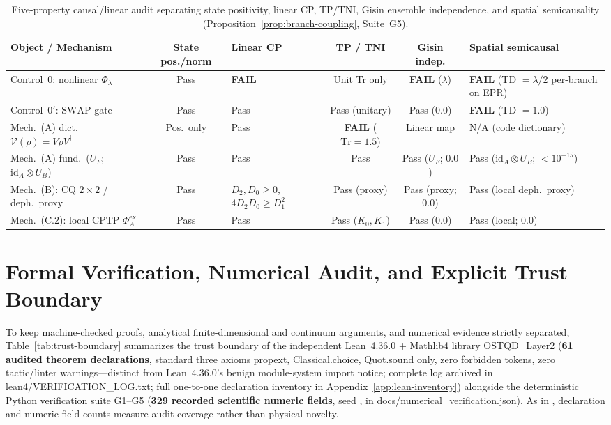 \documentclass[11pt,a4paper]{article}
\theoremstyle{definition}
\theoremstyle{remark}
\newcommand{\id}{\mathrm{id}}
\newcommand{\1}{\mathbf{1}}
\newcommand{\code}[1]{{\scriptsize\ttfamily #1}}
\begin{document}
\begin{table}[!tb]
\centering
\caption{Five-property causal/linear audit separating state positivity, linear CP, TP/TNI, Gisin ensemble independence, and spatial semicausality (Proposition~\ref{prop:branch-coupling}, Suite~G5).}
\label{tab:gate}
\scriptsize
\setlength{\tabcolsep}{3.2pt}
\begin{tabular}{@{} >{\raggedright\arraybackslash}p{2.9cm} c >{\centering\arraybackslash}p{2.0cm} c c >{\raggedright\arraybackslash}p{2.8cm} @{}}
\toprule
Object / Mechanism & State pos./norm & Linear CP & TP / TNI & Gisin indep. & Spatial semicausal \\
\midrule
Control~0: nonlinear $\Phi_\lambda$ & Pass & \textbf{FAIL} & Unit Tr only & \textbf{FAIL} ($\lambda$) & \textbf{FAIL} (TD $=\lambda/2$ per-branch on EPR) \\
Control~0$'$: $\mathrm{SWAP}$ gate & Pass & Pass & Pass (unitary) & Pass ($0.0$) & \textbf{FAIL} (TD $=1.0$) \\
Mech.~(A) dict.\ $\mathcal{V}(\rho)=V\rho V^\dagger$ & Pos.\ only & Pass & \textbf{FAIL} ($\mathrm{Tr}=1.5$) & Linear map & N/A (code dictionary) \\
Mech.~(A) fund.\ ($U_F$; $\id_A\!\otimes\!U_B$) & Pass & Pass & Pass & Pass ($U_F$; $0.0$) & Pass ($\id_A\!\otimes\!U_B$; $<10^{-15}$) \\
Mech.~(B): CQ $2\times 2$ / deph.\ proxy & Pass & $D_2,D_0\ge 0$, $4D_2D_0\ge D_1^2$ & Pass (proxy) & Pass (proxy; $0.0$) & Pass (local deph.\ proxy) \\
Mech.~(C.2): local CPTP $\Phi_A^{\mathrm{ex}}$ & Pass & Pass & Pass ($K_0,K_1$) & Pass ($0.0$) & Pass (local; $0.0$) \\
\bottomrule
\end{tabular}
\end{table}

\section{Formal Verification, Numerical Audit, and Explicit Trust Boundary}\label{sec:verification}

To keep machine-checked proofs, analytical finite-dimensional and continuum arguments, and numerical evidence strictly separated, Table~\ref{tab:trust-boundary} summarizes the trust boundary of the independent Lean~4.36.0 + Mathlib4 library \code{OSTQD\_Layer2} (\textbf{61 audited theorem declarations}, standard three axioms \code{propext}, \code{Classical.choice}, \code{Quot.sound} only, zero forbidden tokens, zero tactic/linter warnings---distinct from Lean~4.36.0's benign \code{module}-system import notice; complete log archived in \code{lean4/VERIFICATION\_LOG.txt}; full one-to-one declaration inventory in Appendix~\ref{app:lean-inventory}) alongside the deterministic Python verification suite G1--G5 (\textbf{329 recorded scientific numeric fields}, seed \code{20261128}, in \code{docs/numerical\_verification.json}). As in \cite{Soga2026OSTQD,Soga2026OSTQDSK}, declaration and numeric field counts measure audit coverage rather than physical novelty.
\end{document}
